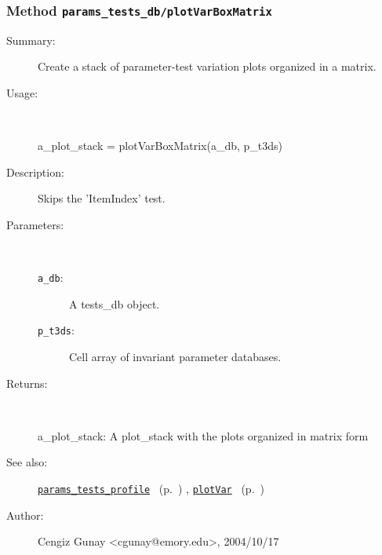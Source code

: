 \subsubsection[Method \texttt{plotVarBoxMatrix}]{Method \texttt{params\_tests\_db/plotVarBoxMatrix}}%
%
\label{ref_params_tests_db__plotVarBoxMatrix}%
\hypertarget{ref_params_tests_db__plotVarBoxMatrix}{}%
\begin{description}
\item[Summary:]Create a stack of parameter-test variation plots 
		organized in a matrix.
%
\item[Usage:]~%
\begin{lyxcode}%
a\_plot\_stack = plotVarBoxMatrix(a\_db, p\_t3ds)
%
\end{lyxcode}%
%
\item[Description:]%
Skips the 'ItemIndex' test.
\item[Parameters:]~
\begin{description}%
\item[\texttt{a\_db}:]
 A tests\_db object.
\item[\texttt{p\_t3ds}:]
 Cell array of invariant parameter databases.
\end{description}%
%
\item[Returns:
]~

	a\_plot\_stack: A plot\_stack with the plots organized in matrix form
%
%
\item[See also:]%
\hyperlink{ref_params_tests_profile}{\texttt{params\_tests\_profile}}%
\ (p.~\pageref{ref_params_tests_profile})%
%
, \hyperlink{ref_plotVar}{\texttt{plotVar}}%
\ (p.~\pageref{ref_plotVar})%
%
%
\item[Author:]%
Cengiz Gunay <cgunay@emory.edu>, 2004/10/17
%
\end{description}
\methodline%
